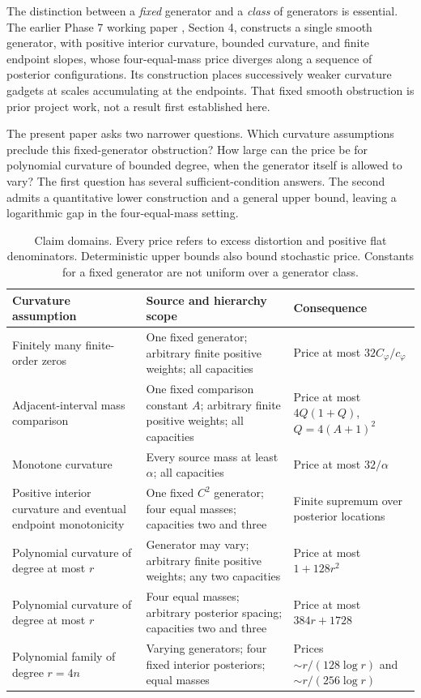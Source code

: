 \documentclass[11pt]{article}
\theoremstyle{definition}\newtheorem{definition}[theorem]{Definition}
\theoremstyle{remark}\newtheorem{remark}[theorem]{Remark}
\newcommand{\ph}{\varphi}
\begin{document}
The distinction between a \emph{fixed} generator and a \emph{class} of generators is essential. The earlier Phase 7 working paper \cite{huang7}, Section 4, constructs a single smooth generator, with positive interior curvature, bounded curvature, and finite endpoint slopes, whose four-equal-mass price diverges along a sequence of posterior configurations. Its construction places successively weaker curvature gadgets at scales accumulating at the endpoints. That fixed smooth obstruction is prior project work, not a result first established here.

The present paper asks two narrower questions. Which curvature assumptions preclude this fixed-generator obstruction? How large can the price be for polynomial curvature of bounded degree, when the generator itself is allowed to vary? The first question has several sufficient-condition answers. The second admits a quantitative lower construction and a general upper bound, leaving a logarithmic gap in the four-equal-mass setting.

\begin{table}[ht]
\centering\small
\begin{tabular}{@{}>{\raggedright\arraybackslash}p{}>{\raggedright\arraybackslash}p{}>{\raggedright\arraybackslash}p{}@{}}
\toprule
Curvature assumption & Source and hierarchy scope & Consequence \\
\midrule
Finitely many finite-order zeros & One fixed generator; arbitrary finite positive weights; all capacities & Price at most $32C_\ph/c_\ph$ \\
Adjacent-interval mass comparison & One fixed comparison constant $A$; arbitrary finite positive weights; all capacities & Price at most $4Q(1+Q)$, $Q=4(A+1)^2$ \\
Monotone curvature & Every source mass at least $\alpha$; all capacities & Price at most $32/\alpha$ \\
Positive interior curvature and eventual endpoint monotonicity & One fixed $C^2$ generator; four equal masses; capacities two and three & Finite supremum over posterior locations \\
Polynomial curvature of degree at most $r$ & Generator may vary; arbitrary finite positive weights; any two capacities & Price at most $1+128r^2$ \\
Polynomial curvature of degree at most $r$ & Four equal masses; arbitrary posterior spacing; capacities two and three & Price at most $384r+1728$ \\
Polynomial family of degree $r=4n$ & Varying generators; four fixed interior posteriors; equal masses & Prices $\sim r/(128\log r)$ and $\sim r/(256\log r)$ \\
\bottomrule
\end{tabular}
\caption{Claim domains. Every price refers to excess distortion and positive flat denominators. Deterministic upper bounds also bound stochastic price. Constants for a fixed generator are not uniform over a generator class.}
\label{tab:scope}
\end{table}
\end{document}
